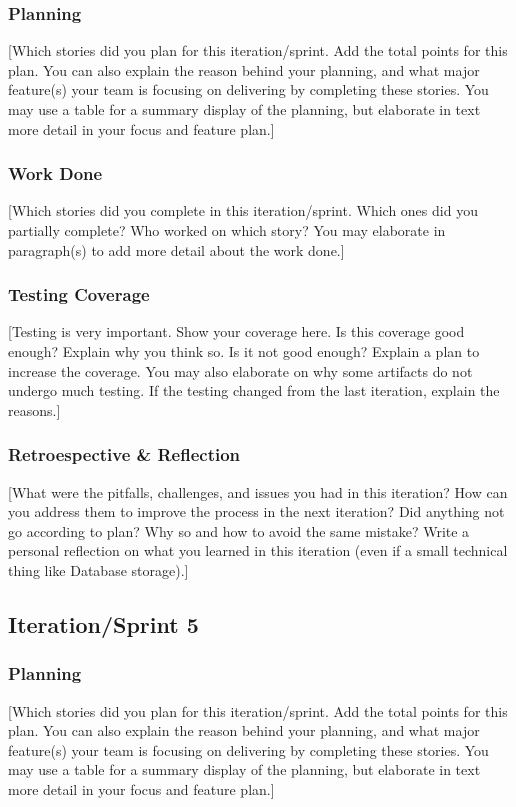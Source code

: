 \documentclass{article}
\begin{document}
\subsubsection{Planning}
[Which stories did you plan for this iteration/sprint. Add the total points for this plan. You can also explain the reason behind your planning, and what major feature(s) your team is focusing on delivering by completing these stories. You may use a table for a summary display of the planning, but elaborate in text more detail in your focus and feature plan.]

\subsubsection{Work Done}
[Which stories did you complete in this iteration/sprint. Which ones did you partially complete? Who worked on which story? You may elaborate in paragraph(s) to add more detail about the work done.]

\subsubsection{Testing Coverage}
[Testing is very important. Show your coverage here. Is this coverage good enough? Explain why you think so. Is it not good enough? Explain a plan to increase the coverage. You may also elaborate on why some artifacts do not undergo much testing. If the testing changed from the last iteration, explain the reasons.]

\subsubsection{Retroespective \& Reflection}
[What were the pitfalls, challenges, and issues you had in this iteration? How can you address them to improve the process in the next iteration? Did anything not go according to plan? Why so and how to avoid the same mistake? Write a personal reflection on what you learned in this iteration (even if a small technical thing like Database storage).]

\subsection{Iteration/Sprint 5}
\subsubsection{Planning}
[Which stories did you plan for this iteration/sprint. Add the total points for this plan. You can also explain the reason behind your planning, and what major feature(s) your team is focusing on delivering by completing these stories. You may use a table for a summary display of the planning, but elaborate in text more detail in your focus and feature plan.]
\end{document}
